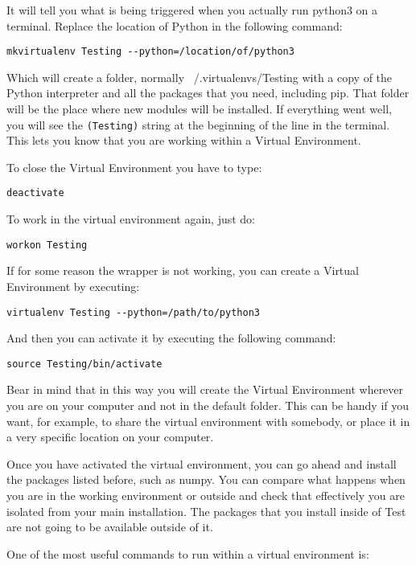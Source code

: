 It will tell you what is being triggered when you actually run python3 on a terminal. Replace the location of Python in the following command:
\begin{verbatim}
mkvirtualenv Testing --python=/location/of/python3
\end{verbatim}

Which will create a folder, normally ~/.virtualenvs/Testing with a copy of the Python interpreter and all the packages that you need, including pip. That folder will be the place where new modules will be installed. If everything went well, you will see the \texttt{(Testing)} string at the beginning of the line in the terminal. This lets you know that you are working within a Virtual Environment.

To close the Virtual Environment you have to type:

\begin{verbatim}
deactivate
\end{verbatim}

To work in the virtual environment again, just do:
\begin{verbatim}
workon Testing
\end{verbatim}

If for some reason the wrapper is not working, you can create a Virtual Environment by executing:
\begin{verbatim}
virtualenv Testing --python=/path/to/python3
\end{verbatim}
And then you can activate it by executing the following command:
\begin{verbatim}
source Testing/bin/activate 
\end{verbatim}

Bear in mind that in this way you will create the Virtual Environment wherever you are on your computer and not in the default folder. This can be handy if you want, for example, to share the virtual environment with somebody, or place it in a very specific location on your computer.

Once you have activated the virtual environment, you can go ahead and install the packages listed before, such as numpy. You can compare what happens when you are in the working environment or outside and check that effectively you are isolated from your main installation. The packages that you install inside of Test are not going to be available outside of it.

One of the most useful commands to run within a virtual environment is:

